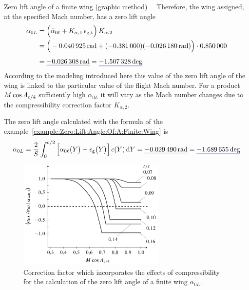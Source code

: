 \documentclass[[12pt,twoside]{book}
\begin{document}
\begin{myExampleX}{Zero lift angle of a finite wing (graphic method)}{\ \myIconGraph\ }
Therefore, the wing assigned, at the specified Mach number, has a zero lift angle
\[
\begin{split}
\label{eq:Wing:Alpha:Zero:Lift:Roskam:Datcom}
\alpha_{0L} 
  & {}=
    \Big(
      \bar{\alpha}_{0\ell} + K_{\alpha,1} \, \epsilon_{\mathrm{g,t}}
    \Big) \, K_{\alpha,2}
\\
  & {}= 
    \Big(
      \SI[round-precision=4]{\myAlphaZeroLiftMeanWingRAD}{\radian}
        + ( \SI[round-precision=3]{\myDeltaAlphaZeroLiftOverTwistWing}{} )
          ( \SI[round-precision=4]{\myTwistWingRAD}{\radian} )
    \Big)
      \cdot \SI[round-precision=2]{\myPrandtlGlauertCorrectionAlphaZeroLiftWing}{}
\\[4pt]
  & {}= \mathunderline{mydarkblue}{ \SI[round-precision=4]{\myAlphaZeroLiftDatcomWingRAD}{\radian} }
  = \mathunderline{mydarkblue}{ \SI[round-precision=2]{\myAlphaZeroLiftDatcomWingDEG}{\deg} }
\end{split}
\]
According to the modeling introduced here
this value of the zero lift angle of the wing is linked to the particular value of the flight Mach number. For a product $M \cos\Lambda_{c/4}$ sufficiently high
$\alpha_{0L}$ it will vary as the Mach number changes due to the compressibility correction factor $K_{\alpha,2}$.

The zero lift angle calculated with the formula
of the example~\ref{example:Zero:Lift:Angle:Of:A:Finite:Wing}
is
\[
\alpha_{0L} 
  = \frac{2}{S} \int_0^{b/2} 
    \Big[ 
      \alpha_{0\ell}\big(Y\big) - \epsilon_\mathrm{g}\big(Y\big) 
    \Big] \, c(Y) \diff{Y}
  = \mathunderline{mydarkblue}{ \SI[round-precision=4]{\myAlphaZeroLiftWingRAD}{\radian} }
  = \mathunderline{mydarkblue}{ \SI[round-precision=2]{\myAlphaZeroLiftWingDEG}{\deg} }
\]
\begin{figure}[H]%
  \includegraphics[width=0.65\textwidth]{Chapter_2/zero_lift_angle_graphic_method/plot_alpha0_PrandtlGlauert_scale.pdf}%
  \caption{
           Correction factor 
           which incorporates the effects of compressibility for the calculation of the zero lift angle
          of a finite wing $\alpha_{0L}$.}
  \label{fig:Alpha:Zero:Lift:PrandtlGlauert:Scale:Plots}%
\end{figure}
\end{myExampleX}
\end{document}
